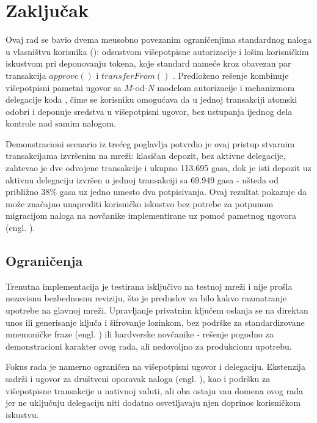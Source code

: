 \chapter{Zaklju\v cak}

Ovaj rad se bavio dvema me\dj usobno povezanim ograni\v cenjima standardnog  naloga u vlasni\v stvu korisnika (): odsustvom vi\v sepotpisne autorizacije i lo\v sim korisni\v ckim iskustvom pri deponovanju  tokena, koje standard  name\' ce kroz obavezan par transakcija $approve()$ i $transferFrom()$ \cite{erc20}. Predlo\v zeno re\v senje kombinuje vi\v sepotpisni pametni ugovor sa $M$-od-$N$ modelom autorizacije i  mehanizmom delegacije koda \cite{eip7702}, \v cime se korisniku omogu\' cava da u jednoj transakciji atomski odobri i deponuje sredstva u vi\v sepotpisni ugovor, bez ustupanja ijednog dela kontrole nad samim nalogom.

Demonstracioni scenario iz tre\' ceg poglavlja potvrdio je ovaj pristup stvarnim transakcijama izvr\v senim na  mre\v zi: klasi\v can depozit, bez aktivne delegacije, zahtevao je dve odvojene transakcije i ukupno 113.695 gasa, dok je isti depozit uz aktivnu  delegaciju izvr\v sen u jednoj transakciji sa 69.949 gasa - u\v steda od pribli\v zno 38\% gasa uz jedno umesto dva potpisivanja. Ovaj rezultat pokazuje da  mo\v ze zna\v cajno unaprediti korisni\v cko iskustvo bez potrebe za potpunom migracijom naloga na nov\v canike implementirane  uz pomo\' c pametnog ugovora (engl. ).

\section{Ograni\v cenja}

Trenutna implementacija je testirana isklju\v civo na  testnoj mre\v zi i nije pro\v sla nezavisnu bezbednosnu reviziju, \v sto je preduslov za bilo kakvo razmatranje upotrebe na glavnoj  mre\v zi. Upravljanje privatnim klju\v cem oslanja se na direktan unos ili generisanje klju\v ca i \v sifrovanje lozinkom, bez podr\v ske za standardizovane mnemoni\v cke fraze (engl. ) \cite{bip39} ili hardverske nov\v canike - re\v senje pogodno za demonstracioni karakter ovog rada, ali nedovoljno za produkcionu upotrebu.

Fokus rada je namerno ograni\v cen na vi\v sepotpisni ugovor i  delegaciju. Ekstenzija sadr\v zi i ugovor za dru\v stveni oporavak naloga (engl. ), kao i podr\v sku za vi\v sepotpisne transakcije u nativnoj  valuti, ali oba ostaju van domena ovog rada jer ne uklju\v cuju  delegaciju niti dodatno osvetljavaju njen doprinos korisni\v ckom iskustvu.

